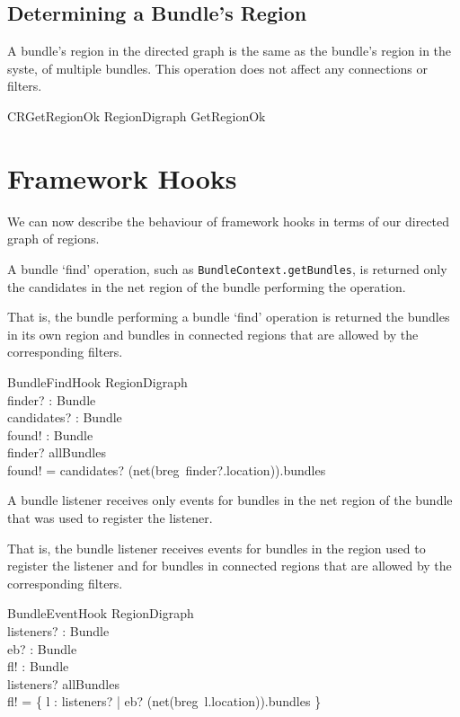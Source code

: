 \documentclass[a4paper,9pt]{article}
\begin{document}
\subsection{Determining a Bundle's Region}

A bundle's region in the directed graph is the same as the bundle's
region in the syste, of multiple bundles.
This operation does not affect any connections or filters.
\begin{zed}
  CRGetRegionOk  \Xi RegionDigraph \land GetRegionOk \\
\end{zed}

\clearpage
\section{Framework Hooks}
\label{cha:fhooks}

We can now describe the behaviour of framework hooks in terms of our directed graph of regions.

A bundle `find' operation, such as \texttt{BundleContext.getBundles}, is returned only the
candidates in the net region of the bundle performing the operation.

That is, the bundle performing a bundle `find' operation is returned the bundles in its own region
and bundles in connected regions that are allowed by the corresponding filters.
\begin{schema}{BundleFindHook}
  \Xi RegionDigraph \\
  finder? : Bundle \\
  candidates? : \power Bundle \\
  found! : \power Bundle \\
\where
  finder? \in allBundles \\
  found! = candidates? \cap (net(breg~finder?.location)).bundles \\
\end{schema}

A bundle listener receives only events for bundles in the net region of the bundle that was used
to register the listener.

That is, the bundle listener receives events for bundles in the region used to register the listener
and for bundles in connected regions that are allowed by the corresponding filters.
\begin{schema}{BundleEventHook}
  \Xi RegionDigraph \\
  listeners? : \power Bundle \\
  eb? : Bundle \\
  fl! : \power Bundle \\
\where
  listeners? \subseteq allBundles \\
  fl! = \{ l : listeners? | eb? \in (net(breg~l.location)).bundles \} \\
\end{schema}
\end{document}
